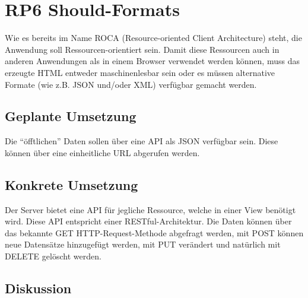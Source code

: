 \section{RP6 Should-Formats}
\label{sec:principle-rp6-should-formats}
Wie es bereits im Name ROCA (Resource-oriented Client Architecture) steht, die Anwendung soll Ressourcen-orientiert sein. Damit diese Ressourcen auch in anderen Anwendungen als in einem Browser verwendet werden können, muss das erzeugte HTML entweder maschinenlesbar sein oder es müssen alternative Formate (wie z.B. JSON und/oder XML) verfügbar gemacht werden.

\subsection*{Geplante Umsetzung}
Die ``öfftlichen'' Daten sollen über eine API als JSON verfügbar sein. Diese können über eine einheitliche URL abgerufen werden.


\subsection*{Konkrete Umsetzung}
Der Server bietet eine API für jegliche Ressource, welche in einer View benötigt wird. Diese API entspricht einer RESTful-Architektur. Die Daten können über das bekannte GET HTTP-Request-Methode abgefragt werden, mit POST können neue Datensätze hinzugefügt werden, mit PUT verändert und natürlich mit DELETE gelöscht werden.



\subsection*{Diskussion}
